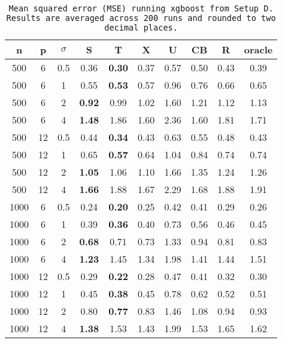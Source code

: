 \begin{table}[ht]
\centering
\begin{tabular}{cccccccccc}
  \hline
n & p & $\sigma$ & S & T & X & U & CB & R & oracle \\ 
  \hline
500 & 6 & 0.5 & 0.36 & \bf 0.30 & 0.37 & 0.57 & 0.50 & 0.43 & 0.39 \\ 
  500 & 6 & 1 & 0.55 & \bf 0.53 & 0.57 & 0.96 & 0.76 & 0.66 & 0.65 \\ 
  500 & 6 & 2 & \bf 0.92 & 0.99 & 1.02 & 1.60 & 1.21 & 1.12 & 1.13 \\ 
  500 & 6 & 4 & \bf 1.48 & 1.86 & 1.60 & 2.36 & 1.60 & 1.81 & 1.71 \\ 
  500 & 12 & 0.5 & 0.44 & \bf 0.34 & 0.43 & 0.63 & 0.55 & 0.48 & 0.43 \\ 
  500 & 12 & 1 & 0.65 & \bf 0.57 & 0.64 & 1.04 & 0.84 & 0.74 & 0.74 \\ 
  500 & 12 & 2 & \bf 1.05 & 1.06 & 1.10 & 1.66 & 1.35 & 1.24 & 1.26 \\ 
  500 & 12 & 4 & \bf 1.66 & 1.88 & 1.67 & 2.29 & 1.68 & 1.88 & 1.91 \\ 
  1000 & 6 & 0.5 & 0.24 & \bf 0.20 & 0.25 & 0.42 & 0.41 & 0.29 & 0.26 \\ 
  1000 & 6 & 1 & 0.39 & \bf 0.36 & 0.40 & 0.73 & 0.56 & 0.46 & 0.45 \\ 
  1000 & 6 & 2 & \bf 0.68 & 0.71 & 0.73 & 1.33 & 0.94 & 0.81 & 0.83 \\ 
  1000 & 6 & 4 & \bf 1.23 & 1.45 & 1.34 & 1.98 & 1.41 & 1.44 & 1.51 \\ 
  1000 & 12 & 0.5 & 0.29 & \bf 0.22 & 0.28 & 0.47 & 0.41 & 0.32 & 0.30 \\ 
  1000 & 12 & 1 & 0.45 & \bf 0.38 & 0.45 & 0.78 & 0.62 & 0.52 & 0.51 \\ 
  1000 & 12 & 2 & 0.80 & \bf 0.77 & 0.83 & 1.46 & 1.08 & 0.94 & 0.93 \\ 
  1000 & 12 & 4 & \bf 1.38 & 1.53 & 1.43 & 1.99 & 1.53 & 1.65 & 1.62 \\ 
   \hline
\end{tabular}
\caption{\tt Mean squared error (MSE) running \texttt{xgboost} from Setup D. Results are averaged across 200 runs and rounded to two decimal places.} 
\label{table:setup4}
\end{table}
